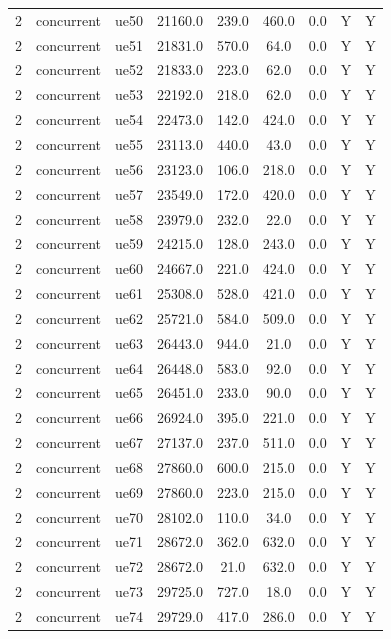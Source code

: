 \begin{table}[ht]
\begin{tabular}{|c|c|c|c|c|c|c|c|c|}
2 & concurrent & ue50 & 21160.0 & 239.0 & 460.0 & 0.0 & Y & Y \\
2 & concurrent & ue51 & 21831.0 & 570.0 & 64.0 & 0.0 & Y & Y \\
2 & concurrent & ue52 & 21833.0 & 223.0 & 62.0 & 0.0 & Y & Y \\
2 & concurrent & ue53 & 22192.0 & 218.0 & 62.0 & 0.0 & Y & Y \\
2 & concurrent & ue54 & 22473.0 & 142.0 & 424.0 & 0.0 & Y & Y \\
2 & concurrent & ue55 & 23113.0 & 440.0 & 43.0 & 0.0 & Y & Y \\
2 & concurrent & ue56 & 23123.0 & 106.0 & 218.0 & 0.0 & Y & Y \\
2 & concurrent & ue57 & 23549.0 & 172.0 & 420.0 & 0.0 & Y & Y \\
2 & concurrent & ue58 & 23979.0 & 232.0 & 22.0 & 0.0 & Y & Y \\
2 & concurrent & ue59 & 24215.0 & 128.0 & 243.0 & 0.0 & Y & Y \\
2 & concurrent & ue60 & 24667.0 & 221.0 & 424.0 & 0.0 & Y & Y \\
2 & concurrent & ue61 & 25308.0 & 528.0 & 421.0 & 0.0 & Y & Y \\
2 & concurrent & ue62 & 25721.0 & 584.0 & 509.0 & 0.0 & Y & Y \\
2 & concurrent & ue63 & 26443.0 & 944.0 & 21.0 & 0.0 & Y & Y \\
2 & concurrent & ue64 & 26448.0 & 583.0 & 92.0 & 0.0 & Y & Y \\
2 & concurrent & ue65 & 26451.0 & 233.0 & 90.0 & 0.0 & Y & Y \\
2 & concurrent & ue66 & 26924.0 & 395.0 & 221.0 & 0.0 & Y & Y \\
2 & concurrent & ue67 & 27137.0 & 237.0 & 511.0 & 0.0 & Y & Y \\
2 & concurrent & ue68 & 27860.0 & 600.0 & 215.0 & 0.0 & Y & Y \\
2 & concurrent & ue69 & 27860.0 & 223.0 & 215.0 & 0.0 & Y & Y \\
2 & concurrent & ue70 & 28102.0 & 110.0 & 34.0 & 0.0 & Y & Y \\
2 & concurrent & ue71 & 28672.0 & 362.0 & 632.0 & 0.0 & Y & Y \\
2 & concurrent & ue72 & 28672.0 & 21.0 & 632.0 & 0.0 & Y & Y \\
2 & concurrent & ue73 & 29725.0 & 727.0 & 18.0 & 0.0 & Y & Y \\
2 & concurrent & ue74 & 29729.0 & 417.0 & 286.0 & 0.0 & Y & Y \\

\end{tabular}
\end{table}
